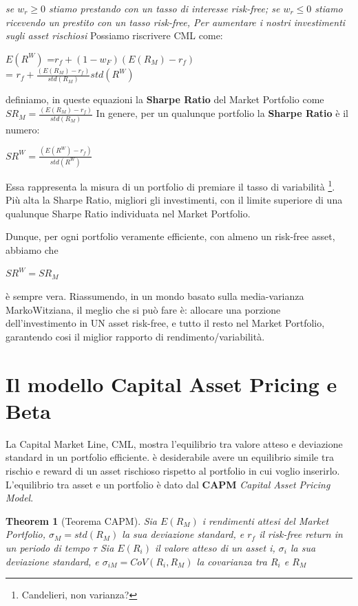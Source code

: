 \documentclass[a4paper,11pt]{report}
\newtheorem{theorem}{Theorem}
\begin{document}
{	\emph{ se $w_r \geq 0 $ stiamo prestando con un tasso di interesse risk-free; se $w_r \leq 0 $ stiamo ricevendo un prestito 
	con un tasso risk-free, Per aumentare i nostri investimenti sugli asset rischiosi }
	 \newline
	Possiamo riscrivere CML come:
\begin{center}
	$E(R^W)$ =$ r_f+(1-w_F)(E(R_M)-r_f)$ \\
	 = $r_f+{\frac{(E(R_M)-r_f)}{std(R_M)}}std(R^W)$
\end{center}
 	definiamo, in queste equazioni la \textbf{Sharpe Ratio} del Market Portfolio come $SR_M={\frac{(E(R_M)-r_f)}{std(R_M)}}$  \newline
	In genere, per un qualunque portfolio la \textbf{Sharpe Ratio} è il numero:
\begin{center}
	$SR^W={\frac{(E(R^W)-r_f)}{std(R^W)}}$
\end{center}
	Essa rappresenta la misura di un portfolio di premiare il tasso di variabilità \footnote{Candelieri, non varianza?}. \newline
	Più alta la Sharpe Ratio, migliori gli investimenti, con il limite superiore di una qualunque Sharpe Ratio individuata nel Market 
	Portfolio. 

	Dunque, per ogni portfolio veramente efficiente, con almeno un risk-free asset, abbiamo che 
\begin{center}
	$SR^W = SR_M$
\end{center}
	è sempre vera.  \newline
	Riassumendo, in un mondo basato sulla media-varianza MarkoWitziana, il meglio che si può fare è: \newline
	 allocare  una porzione dell'investimento in UN  asset risk-free, e tutto il resto nel Market Portfolio, \newline
	garantendo cosi il miglior rapporto di rendimento/variabilità. 

\newpage
\section{Il modello Capital Asset Pricing e Beta}
	La Capital Market Line, CML, mostra l'equilibrio tra valore atteso e deviazione standard in un portfolio efficiente. \newline
	è desiderabile avere un equilibrio simile tra rischio e reward di un asset rischioso rispetto al portfolio in cui voglio inserirlo. \newline
	L'equilibrio tra asset e un portfolio è dato dal \textbf{CAPM} \emph{Capital Asset Pricing Model}.
\begin{theorem}[Teorema CAPM]
	Sia $E(R_M)$ i rendimenti attesi del \emph{Market Portfolio}, $\sigma_M = std(R_M)$ la sua deviazione standard, e $r_f$ il risk-free return in un periodo di tempo $\tau$ \newline
	Sia $E(R_i)$ il valore atteso di un asset i, $\sigma_i$ la sua deviazione standard, e $\sigma_{iM}=CoV(R_i,R_M)$ la covarianza tra $R_i$ e $R_M$


\end{theorem}}
\end{document}

